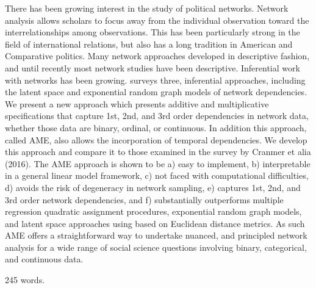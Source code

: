 There has been growing interest in the study of political networks. Network analysis allows scholars to focus away from the individual observation toward the interrelationships among observations. This has been particularly strong in the field of international relations, but also has a long tradition in American and Comparative politics.  Many network approaches developed in descriptive fashion, and until recently most network studies have been descriptive. Inferential work with networks has been growing.   \citet{cranmer:etal:2016} surveys three, inferential approaches, including the latent space and exponential random graph models of network dependencies.  We present a new approach which presents additive and multiplicative specifications that capture 1st, 2nd, and 3rd order dependencies in network data, whether those data are binary, ordinal, or continuous. In addition this approach, called AME,  also allows the incorporation of temporal dependencies.  We develop this approach and compare it to those examined in the survey by Cranmer et alia (2016).  The AME approach is shown to be a) easy to implement, b) interpretable in a general linear model framework, c) not faced with computational difficulties, d) avoids the risk of degeneracy in network sampling, e) captures 1st, 2nd, and 3rd order network dependencies, and f) substantially outperforms multiple regression quadratic assignment procedures, exponential random graph models, and latent space approaches using based on Euclidean distance metrics. As such AME offers a straightforward way to undertake nuanced, and principled network analysis for a wide range of social science questions involving binary, categorical, and continuous data. 

245 words.